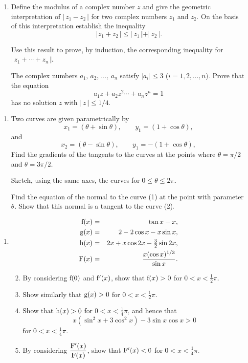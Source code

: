 \documentclass[a4, 11pt]{report}
\newlength{\qspace}
\newcounter{qnumber}
\newenvironment{question}%
 {\vspace{\qspace}
  \begin{enumerate}[\bfseries 1\quad][10]%
    \setcounter{enumi}{\value{qnumber}}%
    \item%
 }
{
  \end{enumerate}
  \filbreak
  \stepcounter{qnumber}
 }
\newenvironment{questionparts}[1][1]%
 {
  \begin{enumerate}[\bfseries (i)]%
    \setcounter{enumii}{#1}
    \addtocounter{enumii}{-1}
    \setlength{\itemsep}{5mm}
    \setlength{\parskip}{8pt}
 }
 {
  \end{enumerate}
 }
\def\g{{\rm g}}
\def\h{{\rm h}}
\def\f{{\rm f}}
\def\le{\leqslant}
\begin{document}
\begin{question}
Define the modulus of a complex number $z$ and give the geometric
interpretation
of $\vert\,z_1-z_2\,\vert$ for two complex numbers $z_1$ and $z_2$. On the 
basis of this interpretation establish the inequality
$$\vert\,z_1+z_2\,\vert\le \vert\,z_1\,\vert+\vert\,z_2\,\vert.$$

Use this result to prove, by induction, the corresponding inequality for
$\vert\,z_1+\cdots+z_n\,\vert$.

The complex numbers $a_1,\,a_2,\,\ldots,\,a_n$ 
satisfy $|a_i|\le 3$ ($i=1, 2,  \ldots ,  n$). Prove that the equation
$$a_1z+a_2z^2\cdots +a_nz^n=1$$
has no solution $z$ with $\vert\,z\,\vert\le 1/4$.
	\end{question}
	
\begin{question}
Two curves are given parametrically by
\[
x_{1}=(\theta+\sin\theta),\qquad y_{1}=(1+\cos\theta),\tag{1}
\]and
\[
x_{2}=(\theta-\sin\theta),\qquad y_{1}=-(1+\cos\theta),\tag{2}
\]
Find the gradients of the tangents to the curves at the points where 
$\theta= \pi/2$ and $\theta=3\pi/2$. 

Sketch, using the same axes, the
curves
for $0\le\theta \le 2\pi$.

Find the equation of the normal to the
curve (1) at the point with parameter $\theta$. Show that this normal is
a tangent to the curve (2).
\end{question}
	
\begin{question}
\begin{eqnarray*}
{\rm f}(x)&=& \tan x-x,\\
{\rm g}(x)&=& 2-2\cos x-x\sin x,\\
{\rm h}(x)&=& 2x+x\cos 2x-\tfrac{3}{2}\sin 2x,\\
{\rm F}(x)&=& {x(\cos x)^{1/3}\over\sin x}.
\end{eqnarray*}
\vspace{1mm}
\begin{questionparts}
\item By considering $\f(0)$ and $\f'(x)$, show that $\f(x)>0$
for $0<x<\tfrac{1}{2}\pi$.

\item Show similarly that $\g(x)>0$ for $0<x<\tfrac{1}{2}\pi$.

\item Show that $\h(x)>0$ for $0<x<\tfrac{1}{4}\pi$, and hence that
\[x(\sin^2x+3\cos^2x)-3\sin x\cos x>0\] for $0<x<\tfrac{1}{4}\pi$.

\item By considering $\displaystyle {{\rm F}'(x)\over {\rm F}(x)}$,
 show that ${\rm F}'(x)<0$ for $0<x<\tfrac{1}{4}\pi$.
\end{questionparts}
\end{question}
		
\end{document}
